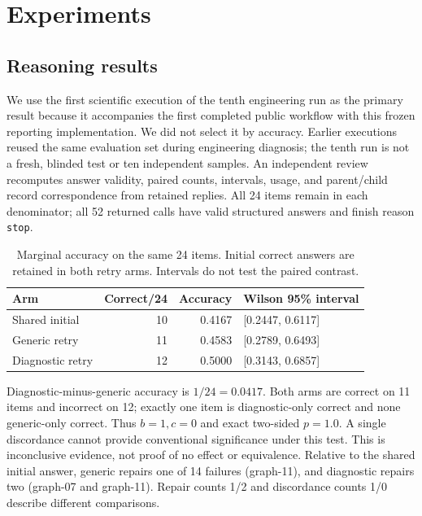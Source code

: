 \section{Experiments}
\subsection{Reasoning results}
We use the first scientific execution of the tenth engineering run as the primary result because it accompanies the first completed public workflow with this frozen reporting implementation. We did not select it by accuracy. Earlier executions reused the same evaluation set during engineering diagnosis; the tenth run is not a fresh, blinded test or ten independent samples. An independent review recomputes answer validity, paired counts, intervals, usage, and parent/child record correspondence from retained replies. All 24 items remain in each denominator; all 52 returned calls have valid structured answers and finish reason \texttt{stop}.

\begin{table}[t]
\centering
\begin{tabular}{lrrl}
\toprule
Arm & Correct/24 & Accuracy & Wilson 95\% interval\\
\midrule
Shared initial & 10 & 0.4167 & [0.2447, 0.6117]\\
Generic retry & 11 & 0.4583 & [0.2789, 0.6493]\\
Diagnostic retry & 12 & 0.5000 & [0.3143, 0.6857]\\
\bottomrule
\end{tabular}
\caption{Marginal accuracy on the same 24 items. Initial correct answers are retained in both retry arms. Intervals do not test the paired contrast.}
\label{tab:accuracy}
\end{table}

Diagnostic-minus-generic accuracy is $1/24=0.0417$. Both arms are correct on 11 items and incorrect on 12; exactly one item is diagnostic-only correct and none generic-only correct. Thus $b=1,c=0$ and exact two-sided $p=1.0$. A single discordance cannot provide conventional significance under this test. This is inconclusive evidence, not proof of no effect or equivalence. Relative to the shared initial answer, generic repairs one of 14 failures (graph-11), and diagnostic repairs two (graph-07 and graph-11). Repair counts 1/2 and discordance counts 1/0 describe different comparisons.

